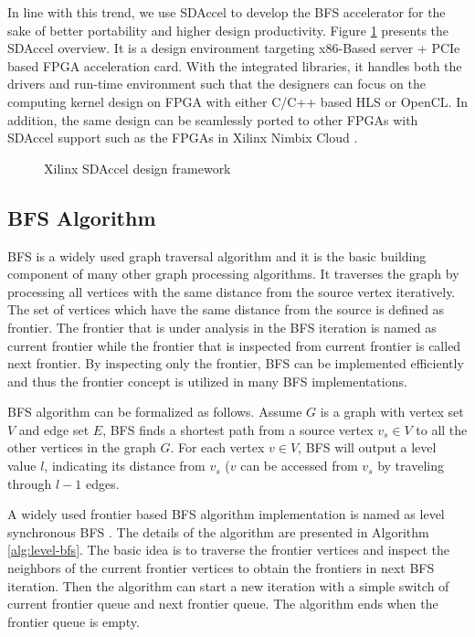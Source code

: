 In line with this trend, we use SDAccel \cite{xilinx-sdaccel} to develop the 
BFS accelerator for the sake of better portability and higher design 
productivity. Figure \ref{fig:sdaccel} presents the SDAccel overview. 
It is a design environment targeting x86-Based server + PCIe 
based FPGA acceleration card. With the integrated libraries, 
it handles both the drivers and run-time environment such that 
the designers can focus on the computing kernel design on FPGA with either 
C/C++ based HLS or OpenCL. In addition, the same design can be seamlessly 
ported to other FPGAs with SDAccel support such as the FPGAs in 
Xilinx Nimbix Cloud \cite{nimbix}.

\begin{figure}
    \caption{Xilinx SDAccel design framework \cite{xilinx-sdaccel}}
\label{fig:sdaccel}
\end{figure}


\subsection{BFS Algorithm}
BFS is a widely used graph traversal algorithm and it is the basic 
building component of many other graph processing algorithms. 
It traverses the graph by processing all vertices with the same distance from the 
source vertex iteratively. The set of vertices which have the same distance from the 
source is defined as frontier. The frontier that is under analysis in the BFS iteration 
is named as current frontier while the frontier that is inspected from current frontier 
is called next frontier. By inspecting only the frontier, BFS can be implemented efficiently 
and thus the frontier concept is utilized in many BFS implementations.

BFS algorithm can be formalized as follows. Assume $G$ is a graph with vertex 
set $V$ and edge set $E$, BFS finds a shortest path from a source vertex
$v_s \in V$ to all the other vertices in the graph $G$. For each vertex $v \in V$, 
BFS will output a level value $l$, indicating its distance from $v_s$ ($v$ can be accessed 
from $v_s$ by traveling through $l - 1$ edges. 

A widely used frontier based BFS algorithm implementation is named as 
level synchronous BFS \cite{attia2014cygraph, betkaoui2012reconfigurable, 
zhang2017boosting}. The details of the algorithm are presented in 
Algorithm \ref{alg:level-bfs}.
The basic idea is to traverse the frontier vertices and inspect the neighbors 
of the current frontier vertices to obtain the frontiers in next BFS iteration. 
Then the algorithm can start a new iteration with a simple switch of 
current frontier queue and next frontier queue. The algorithm ends when 
the frontier queue is empty.

